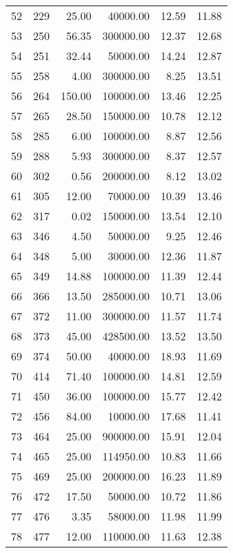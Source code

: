 \begin{tabular}{rrrrrr}
    52 &    229 &  25.00 &  40000.00 &  12.59 & 11.88 \\
    53 &    250 &  56.35 & 300000.00 &  12.37 & 12.68 \\
    54 &    251 &  32.44 &  50000.00 &  14.24 & 12.87 \\
    55 &    258 &   4.00 & 300000.00 &   8.25 & 13.51 \\
    56 &    264 & 150.00 & 100000.00 &  13.46 & 12.25 \\
    57 &    265 &  28.50 & 150000.00 &  10.78 & 12.12 \\
    58 &    285 &   6.00 & 100000.00 &   8.87 & 12.56 \\
    59 &    288 &   5.93 & 300000.00 &   8.37 & 12.57 \\
    60 &    302 &   0.56 & 200000.00 &   8.12 & 13.02 \\
    61 &    305 &  12.00 &  70000.00 &  10.39 & 13.46 \\
    62 &    317 &   0.02 & 150000.00 &  13.54 & 12.10 \\
    63 &    346 &   4.50 &  50000.00 &   9.25 & 12.46 \\
    64 &    348 &   5.00 &  30000.00 &  12.36 & 11.87 \\
    65 &    349 &  14.88 & 100000.00 &  11.39 & 12.44 \\
    66 &    366 &  13.50 & 285000.00 &  10.71 & 13.06 \\
    67 &    372 &  11.00 & 300000.00 &  11.57 & 11.74 \\
    68 &    373 &  45.00 & 428500.00 &  13.52 & 13.50 \\
    69 &    374 &  50.00 &  40000.00 &  18.93 & 11.69 \\
    70 &    414 &  71.40 & 100000.00 &  14.81 & 12.59 \\
    71 &    450 &  36.00 & 100000.00 &  15.77 & 12.42 \\
    72 &    456 &  84.00 &  10000.00 &  17.68 & 11.41 \\
    73 &    464 &  25.00 & 900000.00 &  15.91 & 12.04 \\
    74 &    465 &  25.00 & 114950.00 &  10.83 & 11.66 \\
    75 &    469 &  25.00 & 200000.00 &  16.23 & 11.89 \\
    76 &    472 &  17.50 &  50000.00 &  10.72 & 11.86 \\
    77 &    476 &   3.35 &  58000.00 &  11.98 & 11.99 \\
    78 &    477 &  12.00 & 110000.00 &  11.63 & 12.38 \\

\end{tabular}
